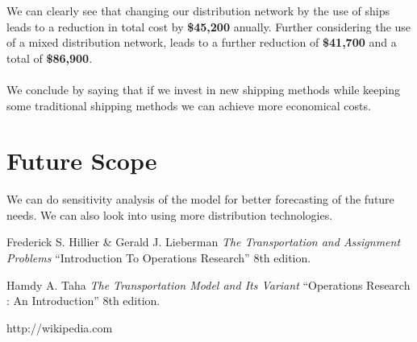\documentclass[12pt]{article}
\numberwithin{equation}{section}
\numberwithin{table}{section}
\numberwithin{figure}{section}
\begin{document}
We can clearly see that changing our distribution network by the use of ships leads to a reduction in total cost by \textbf{\$45,200} anually. Further considering the use of a mixed distribution network,  leads to a further reduction of \textbf{\$41,700} and a total of \textbf{\$86,900}. \\ \\
We conclude by saying that if we invest in new shipping methods while keeping some traditional shipping methods we can achieve more economical costs.

\section{Future Scope}
We can do sensitivity analysis of the model for better forecasting of the future needs. We can also look into using more distribution technologies.

\begin{thebibliography}{3}

Frederick S. Hillier \& Gerald J. Lieberman 
\textit{The Transportation and Assignment Problems} “Introduction To Operations Research” 8th edition.
 
Hamdy A. Taha
\textit{The Transportation Model and Its Variant} “Operations Research : An Introduction” 8th edition.

http://wikipedia.com 

\end{thebibliography}
\end{document}
